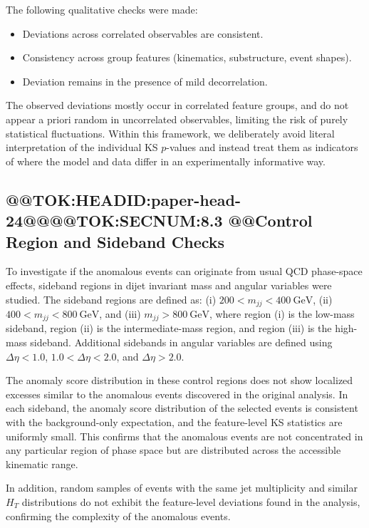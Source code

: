 \documentclass[11pt]{article}
\begin{document}
The following qualitative checks were made:

\begin{itemize}
    \item Deviations across correlated observables are consistent.
    \item Consistency across group features (kinematics, substructure, event shapes).
    \item Deviation remains in the presence of mild decorrelation. 
\end{itemize}

The observed deviations mostly occur in correlated feature groups, and do not appear a priori random in uncorrelated observables, limiting the risk of purely statistical fluctuations. Within this framework, we deliberately avoid literal interpretation of the individual KS $p$-values and instead treat them as indicators of where the model and data differ in an experimentally informative way.

\subsection{@@TOK:HEADID:paper-head-24@@@@TOK:SECNUM:8.3 @@Control Region and Sideband Checks}

To investigate if the anomalous events can originate from usual QCD phase-space effects, sideband regions in dijet invariant mass and angular variables were studied. The sideband regions are defined as: (i) $200 < m_{jj} < 400~\mathrm{GeV}$, (ii) $400 < m_{jj} < 800~\mathrm{GeV}$, and (iii) $m_{jj} > 800~\mathrm{GeV}$, where region (i) is the low-mass sideband, region (ii) is the intermediate-mass region, and region (iii) is the high-mass sideband. Additional sidebands in angular variables are defined using $\Delta\eta < 1.0$, $1.0 < \Delta\eta < 2.0$, and $\Delta\eta > 2.0$.

The anomaly score distribution in these control regions does not show localized excesses similar to the anomalous events discovered in the original analysis. In each sideband, the anomaly score distribution of the selected events is consistent with the background-only expectation, and the feature-level KS statistics are uniformly small. This confirms that the anomalous events are not concentrated in any particular region of phase space but are distributed across the accessible kinematic range.

In addition, random samples of events with the same jet multiplicity and similar $H_T$ distributions do not exhibit the feature-level deviations found in the analysis, confirming the complexity of the anomalous events.
\end{document}
